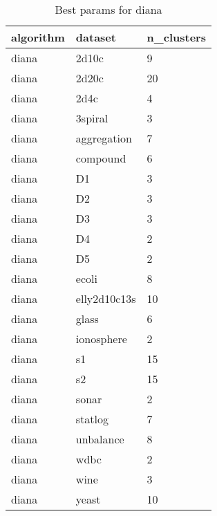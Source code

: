 \clearpage

\begin{table}[H]
\centering
\caption{Best params for diana}
\label{S17_Table}
\begin{tabular}{|l|l|l|}
\hline
algorithm & dataset & n\_clusters \\
\hline
diana & 2d10c & 9 \\
\hline
diana & 2d20c & 20 \\
\hline
diana & 2d4c & 4 \\
\hline
diana & 3spiral & 3 \\
\hline
diana & aggregation & 7 \\
\hline
diana & compound & 6 \\
\hline
diana & D1 & 3 \\
\hline
diana & D2 & 3 \\
\hline
diana & D3 & 3 \\
\hline
diana & D4 & 2 \\
\hline
diana & D5 & 2 \\
\hline
diana & ecoli & 8 \\
\hline
diana & elly2d10c13s & 10 \\
\hline
diana & glass & 6 \\
\hline
diana & ionosphere & 2 \\
\hline
diana & s1 & 15 \\
\hline
diana & s2 & 15 \\
\hline
diana & sonar & 2 \\
\hline
diana & statlog & 7 \\
\hline
diana & unbalance & 8 \\
\hline
diana & wdbc & 2 \\
\hline
diana & wine & 3 \\
\hline
diana & yeast & 10 \\
\hline
\end{tabular}
\end{table}

\clearpage

